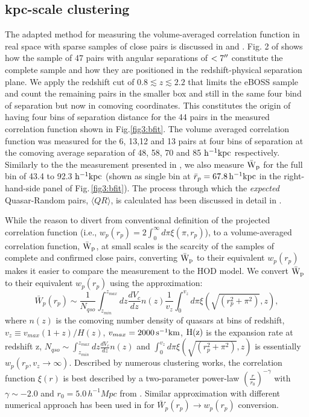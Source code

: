 \documentclass[useAMS,usenatbib]{mn2e}
\begin{document}
\subsection{kpc-scale clustering}\label{kpcls}
The adapted method for measuring the volume-averaged correlation function in real space with sparse samples of close pairs is discussed in \citet{ef17} and \citet{Hen06}. Fig. 2 of \citet{ef17} shows how the sample of 47 pairs with angular separations of $<7\arcsec$ constitute the complete sample and how they are positioned in the redshift-physical separation plane. We apply the redshift cut of $0.8 \lesssim z \lesssim 2.2$ that limits the eBOSS sample and count the remaining pairs in the smaller box and still in the same four bind of separation but now in comoving coordinates. This constitutes the origin of having four bins of separation distance for the 44 pairs in the measured correlation function shown in Fig.\ref{fig3:bfit}. The volume averaged correlation function was measured for the 6, 13,12 and 13 pairs at four bins of separation at the comoving average separation of 48, 58, 70 and 85 $\rm h^{-1} kpc$ respectively. Similarly to the the measurement presented in \citet{ef17}, we also measure $\rm \bar W_p$ for the full bin of 43.4 to 92.3 $\rm h^{-1} kpc$ (shown as single bin at $\bar r_p = 67.8 \, \rm h^{-1} kpc$ in the right-hand-side panel of Fig.\,\ref{fig3:bfit}). The process through which the {\it expected} Quasar-Random pairs, $\langle QR \rangle$, is calculated has been discussed in detail in \citet{ef17}. 

While the reason to divert from conventional definition of the projected 
correlation function (i.e., $w_p(r_p)=2\int_{0}^{\infty} d\pi \xi(\pi, r_p)$), to a volume-averaged correlation function, 
$\rm \bar W_p$, at small scales is the scarcity of the samples of complete and 
confirmed close pairs, converting $\rm \bar W_p$ to their equivalent $w_p(r_p)$ makes it easier to compare the measurement to the HOD model. 
 We convert $\rm \bar W_p$ to their equivalent $w_p(r_p)$ using the approximation:
\begin{equation}
 \bar W_p(r_p) \sim \frac{1}{N_{qso}} \int_{z_{min}}^{z_{max}} dz \frac{dV_c}{dz} n(z) \frac{1}{v_z} \int_{0}^{v_z} d\pi \xi(\sqrt{\left(r_p^2+\pi^2\right)},z),
\end{equation}
where $n(z)$ is the comoving number density of quasars at bins of redshift, $v_z \equiv v_{max}(1+z)/H(z)$, $v_{max}= 2000 \, \rm s^{-1}km$, $\rm H(z)$ is the expansion rate at redshift z, $N_{qso} \sim \int_{z_{min}}^{z_{max}} dz \frac{dV_c}{dz} n(z)$ and $\int_{0}^{v_z} d\pi \xi(\sqrt{\left(r_p^2+\pi^2 \right)},z)$ is essentially $w_p(r_p, v_z \rightarrow \infty)$. Described by numerous clustering works, the correlation function $\xi(r)$ is best described by a two-parameter power-law $(\frac{r}{r_0})^{-\gamma}$ with $\gamma \sim -2.0$ and $r_0=5.0 \, h^{-1} Mpc$ from \citet{ef17}. Similar approximation with different numerical approach has been used in \citet{ko12} for $ \bar W_p(r_p) \rightarrow w_p(r_p)$ conversion.
\end{document}
